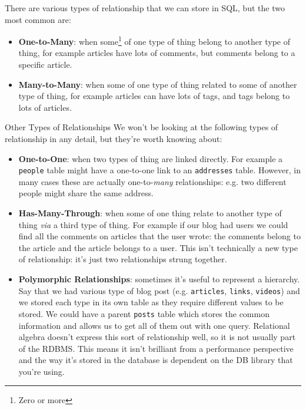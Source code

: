 \pagebreak


There are various types of relationship that we can store in SQL, but the two most common are:

\begin{itemize}
    \item \textbf{One-to-Many}: when some\footnote{Zero or more} of one type of thing belong to another type of thing, for example articles have lots of comments, but comments belong to a specific article.
    \item \textbf{Many-to-Many}: when some of one type of thing related to some of another type of thing, for example articles can have lots of tags, and tags belong to lots of articles.
\end{itemize}

\begin{infobox}{Other Types of Relationships}
    We won't be looking at the following types of relationship in any detail, but they're worth knowing about:

    \begin{itemize}[leftmargin=*]
        \item \textbf{One-to-One}: when two types of thing are linked directly. For example a \texttt{people} table might have a one-to-one link to an \texttt{addresses} table. However, in many cases these are actually one-to-\textit{many} relationships: e.g. two different people might share the same address.
        \item \textbf{Has-Many-Through}: when some of one thing relate to another type of thing \textit{via} a third type of thing. For example if our blog had users we could find all the comments on articles that the user wrote: the comments belong to the article and the article belongs to a user. This isn't technically a new type of relationship: it's just two relationships strung together.
        \item \textbf{Polymorphic Relationships}: sometimes it's useful to represent a hierarchy. Say that we had various type of blog post (e.g. \texttt{articles}, \texttt{links}, \texttt{videos}) and we stored each type in its own table as they require different values to be stored. We could have a parent \texttt{posts} table which stores the common information and allows us to get all of them out with one query. Relational algebra doesn't express this sort of relationship well, so it is not usually part of the RDBMS. This means it isn't brilliant from a performance perspective and the way it's stored in the database is dependent on the DB library that you're using.
    \end{itemize}
\end{infobox}


